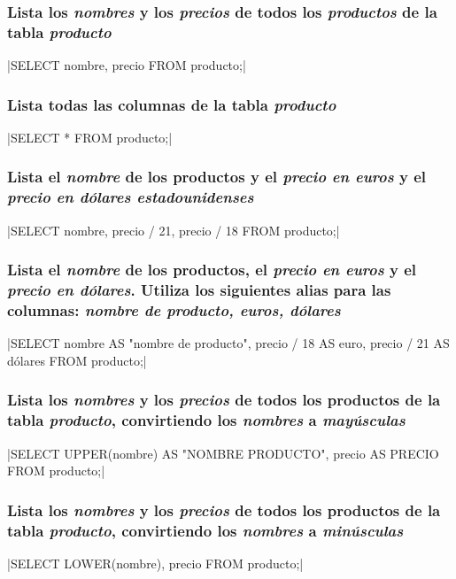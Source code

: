 \documentclass[12pt, letterpaper]{article}
\begin{document}
  \subsubsection{Lista los \textit{\textbf{nombres}} y los \textit{\textbf{precios}} de todos los \textit{\textbf{productos}} de la tabla \textit{\textbf{producto}} }
  |SELECT nombre, precio  FROM producto;|

  \subsubsection{Lista todas las columnas de la tabla \textit{\textbf{producto}}}
  |SELECT * FROM producto;|

  \subsubsection{Lista el \textit{\textbf{nombre}} de los productos y el \textit{\textbf{precio en euros}} y el \textit{\textbf{precio en dólares estadounidenses}}}
  |SELECT nombre, precio / 21, precio / 18 FROM producto;|

  \subsubsection{Lista el \textit{\textbf{nombre}} de los productos, el \textit{\textbf{precio en euros}} y el \textit{\textbf{precio en dólares}}. Utiliza los siguientes alias para las columnas: \textit{\textbf{nombre de producto, euros, dólares}}}
  |SELECT nombre AS "nombre de producto", precio / 18 AS euro, precio / 21 AS dólares FROM producto;|

  \subsubsection{Lista los \textit{\textbf{nombres}} y los \textit{\textbf{precios}} de todos los productos de la tabla \textit{\textbf{producto}}, convirtiendo los \textit{\textbf{nombres}} a \textit{\textbf{mayúsculas}}}
  |SELECT UPPER(nombre) AS "NOMBRE PRODUCTO", precio AS PRECIO FROM producto;|
  
  \subsubsection{Lista los \textit{\textbf{nombres}} y los \textit{\textbf{precios}} de todos los productos de la tabla \textit{\textbf{producto}}, convirtiendo los \textit{\textbf{nombres}} a \textit{\textbf{minúsculas}}}
  |SELECT LOWER(nombre), precio FROM producto;|
\end{document}
